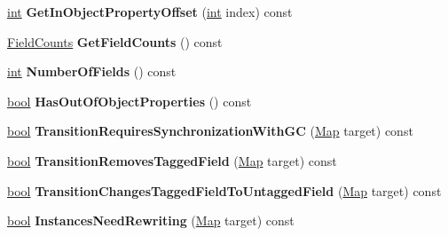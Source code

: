 \begin{DoxyCompactItemize}
\item 
\mbox{\label{classv8_1_1internal_1_1Map_a4bb4f59f38f2e3e3201bd96e0c2495f9}} 
\mbox{\hyperlink{classint}{int}} {\bfseries Get\+In\+Object\+Property\+Offset} (\mbox{\hyperlink{classint}{int}} index) const
\item 
\mbox{\label{classv8_1_1internal_1_1Map_a7251dab21a8a6fc432b1be290970be6f}} 
\mbox{\hyperlink{classv8_1_1internal_1_1Map_1_1FieldCounts}{Field\+Counts}} {\bfseries Get\+Field\+Counts} () const
\item 
\mbox{\label{classv8_1_1internal_1_1Map_a55dc5d8119bbb04f2294cc7f552d632c}} 
\mbox{\hyperlink{classint}{int}} {\bfseries Number\+Of\+Fields} () const
\item 
\mbox{\label{classv8_1_1internal_1_1Map_a1ad84df16255c91ca55b24c60a4419d8}} 
\mbox{\hyperlink{classbool}{bool}} {\bfseries Has\+Out\+Of\+Object\+Properties} () const
\item 
\mbox{\label{classv8_1_1internal_1_1Map_a190b0df3ddd7631538798e6824c3de6b}} 
\mbox{\hyperlink{classbool}{bool}} {\bfseries Transition\+Requires\+Synchronization\+With\+GC} (\mbox{\hyperlink{classv8_1_1internal_1_1Map}{Map}} target) const
\item 
\mbox{\label{classv8_1_1internal_1_1Map_a21651ca2af34d3687e50686e42d037d3}} 
\mbox{\hyperlink{classbool}{bool}} {\bfseries Transition\+Removes\+Tagged\+Field} (\mbox{\hyperlink{classv8_1_1internal_1_1Map}{Map}} target) const
\item 
\mbox{\label{classv8_1_1internal_1_1Map_a76390636c555a1c160311d83b738ad91}} 
\mbox{\hyperlink{classbool}{bool}} {\bfseries Transition\+Changes\+Tagged\+Field\+To\+Untagged\+Field} (\mbox{\hyperlink{classv8_1_1internal_1_1Map}{Map}} target) const
\item 
\mbox{\label{classv8_1_1internal_1_1Map_aef6cced485d61e7abb3320a160e0a00e}} 
\mbox{\hyperlink{classbool}{bool}} {\bfseries Instances\+Need\+Rewriting} (\mbox{\hyperlink{classv8_1_1internal_1_1Map}{Map}} target) const

\end{DoxyCompactItemize}
